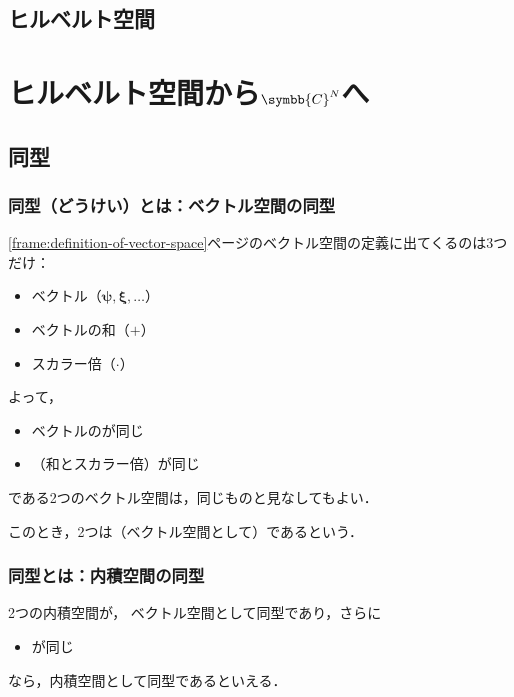 \documentclass[
    10pt,
    ]{sotsu-beamer}
\begin{document}
\subsection{ヒルベルト空間}





\section{ヒルベルト空間から\texorpdfstring{$\symbb{C}^N$}{ℂ\textasciicircum 𝑁}へ}

\subsection{同型}


\begin{frame}
    \frametitle{同型（どうけい）とは：ベクトル空間の同型}

    \ref{frame:definition-of-vector-space}ページのベクトル空間の定義に出てくるのは3つだけ：
    \begin{itemize}
        \item ベクトル（$\symbf{\psi}, \symbf{\xi}, \dotsc$）
        \item ベクトルの和（$+$）
        \item スカラー倍（$\cdotp$）
    \end{itemize}

    \pause

    よって，
    \begin{itemize}
        \item ベクトルのが同じ
        \item {}（和とスカラー倍）が同じ
    \end{itemize}
    である2つのベクトル空間は，同じものと見なしてもよい．

    このとき，2つは（ベクトル空間として）であるという．
    
\end{frame}


\begin{frame}
    \frametitle{同型とは：内積空間の同型}

    2つの内積空間が，
    ベクトル空間として同型であり，さらに
    \begin{itemize}
        \item {}が同じ
    \end{itemize}
    なら，内積空間として同型であるといえる．

\end{frame}
\end{document}
